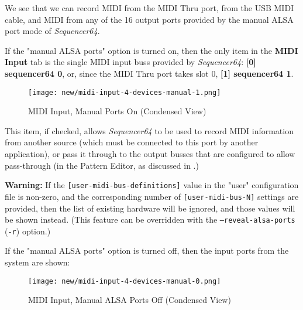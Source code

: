    We see that we can record MIDI from the MIDI Thru port, from the USB MIDI
   cable, and MIDI from any of the 16 output ports provided by the manual ALSA
   port mode of \textsl{Sequencer64}.

   If the "manual ALSA ports" option is turned on,
   then the only item in the \textbf{MIDI Input} tab is the single MIDI input
   buss provided by \textsl{Sequencer64}:  \textbf{[0] sequencer64 0}, or, since
   the MIDI Thru port takes slot 0, \textbf{[1] sequencer64 1}.

\begin{figure}[H]
   \centering 
   \texttt{[image: new/midi-input-4-devices-manual-1.png]}
   \caption{MIDI Input, Manual Ports On (Condensed View)}
   \label{fig:seq64_midi_input_4_devices_manual_1}
\end{figure}

   This item, if checked, allows \textsl{Sequencer64} to be used to record MIDI
   information from another source (which must be connected to this port by
   another application), or pass it through to the output busses
   that are configured to allow pass-through
   (in the Pattern Editor, as discussed in 
   .)

   \textbf{Warning:}
   If the 
   \texttt{[user-midi-bus-definitions]} value in the "user" configuration file
   is non-zero, and the
   corresponding number of
   \texttt{[user-midi-bus-N]} settings are provided, then
   the list of existing hardware will be ignored, and those values will be
   shown instead.
   (This feature can be overridden with the
   \texttt{--reveal-alsa-ports} (\texttt{-r}) option.)


   If the "manual ALSA ports" option is turned off, then
   the input ports from the system are shown:

\begin{figure}[H]
   \centering 
   \texttt{[image: new/midi-input-4-devices-manual-0.png]}
   \caption{MIDI Input, Manual ALSA Ports Off (Condensed View)}
   \label{fig:seq64_midi_input_4_devices_manual_0}
\end{figure}

